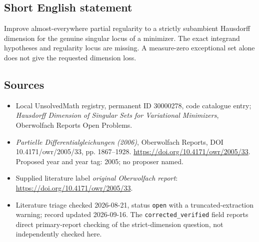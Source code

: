 \documentclass[11pt]{article}
\begin{document}
\subsection{Short English statement}
Improve almost-everywhere partial regularity to a strictly subambient Hausdorff dimension for the genuine singular locus of a minimizer. The exact integrand hypotheses and regularity locus are missing. A measure-zero exceptional set alone does not give the requested dimension loss.
\subsection{Sources}
\begin{itemize}\item Local UnsolvedMath registry, permanent ID 30000278, code catalogue entry; \emph{Hausdorff Dimension of Singular Sets for Variational Minimizers}, Oberwolfach Reports Open Problems.\item \emph{Partielle Differentialgleichungen (2006)}, Oberwolfach Reports, DOI 10.4171/owr/2005/33, pp. 1867--1928. \url{https://doi.org/10.4171/owr/2005/33}. Proposed year and year tag: 2005; no proposer named.\item Supplied literature label \emph{original Oberwolfach report}: \url{https://doi.org/10.4171/owr/2005/33}.\item Literature triage checked 2026-08-21, status \texttt{open} with a truncated-extraction warning; record updated 2026-09-16. The \texttt{corrected\_verified} field reports direct primary-report checking of the strict-dimension question, not independently checked here.\end{itemize}
\end{document}
